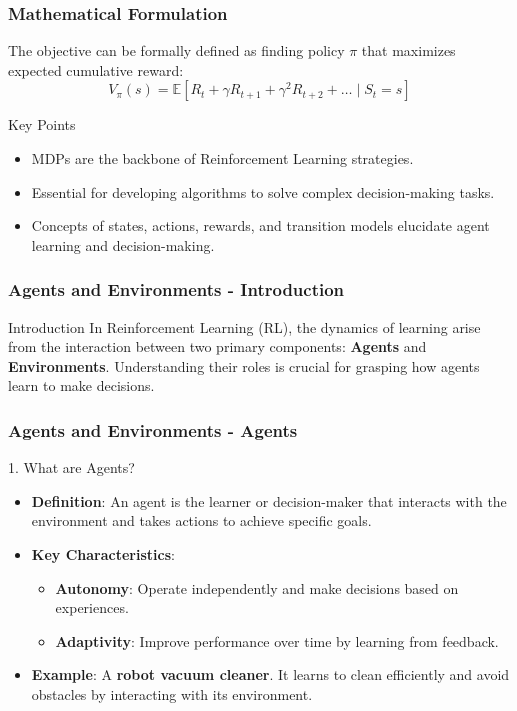 \documentclass[aspectratio=169]{beamer}
\begin{document}
\begin{frame}[fragile]
    \frametitle{Mathematical Formulation}
    The objective can be formally defined as finding policy \( \pi \) that maximizes expected cumulative reward:
    \begin{equation}
    V_\pi(s) = \mathbb{E} \left[ R_t + \gamma R_{t+1} + \gamma^2 R_{t+2} + \ldots \mid S_t = s \right]
    \end{equation}
    \begin{block}{Key Points}
        \begin{itemize}
            \item MDPs are the backbone of Reinforcement Learning strategies.
            \item Essential for developing algorithms to solve complex decision-making tasks.
            \item Concepts of states, actions, rewards, and transition models elucidate agent learning and decision-making.
        \end{itemize}
    \end{block}
\end{frame}

\begin{frame}[fragile]
    \frametitle{Agents and Environments - Introduction}
    \begin{block}{Introduction}
        In Reinforcement Learning (RL), the dynamics of learning arise from the interaction between two primary components: \textbf{Agents} and \textbf{Environments}. Understanding their roles is crucial for grasping how agents learn to make decisions.
    \end{block}
\end{frame}

\begin{frame}[fragile]
    \frametitle{Agents and Environments - Agents}
    \begin{block}{1. What are Agents?}
        \begin{itemize}
            \item \textbf{Definition}: An agent is the learner or decision-maker that interacts with the environment and takes actions to achieve specific goals.
            \item \textbf{Key Characteristics}:
                \begin{itemize}
                    \item \textbf{Autonomy}: Operate independently and make decisions based on experiences.
                    \item \textbf{Adaptivity}: Improve performance over time by learning from feedback.
                \end{itemize}
            \item \textbf{Example}: A \textbf{robot vacuum cleaner}. It learns to clean efficiently and avoid obstacles by interacting with its environment.
        \end{itemize}
    \end{block}
\end{frame}
\end{document}
